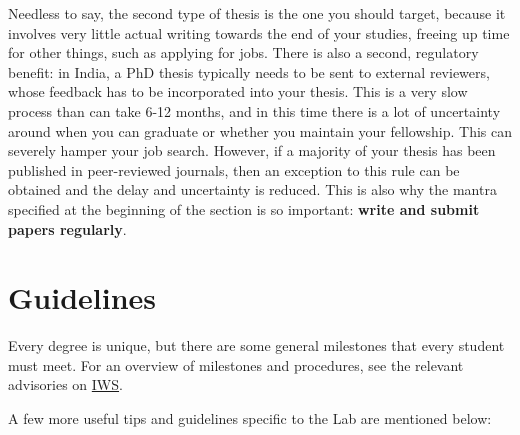 \documentclass[12pt]{article}
\begin{document}
Needless to say, the second type of thesis is the one you should target, because it involves very little actual writing towards the end of your studies, freeing up time for other things, such as applying for jobs. There is also a second, regulatory benefit: in India, a PhD thesis typically needs to be sent to external reviewers, whose feedback has to be incorporated into your thesis. This is a very slow process than can take 6-12 months, and in this time there is a lot of uncertainty around when you can graduate or whether you maintain your fellowship. This can severely hamper your job search. However, if a majority of your thesis has been published in peer-reviewed journals, then an exception to this rule can be obtained and the delay and uncertainty is reduced. This is also why the mantra specified at the beginning of the section is so important: \textbf{write and submit papers regularly}.

\newpage

\section{Guidelines}
Every degree is unique, but there are some general milestones that every student must meet. For an overview of milestones and procedures, see the relevant advisories on \href{https://sites.google.com/iitgn.ac.in/iws/}{IWS}.

A few more useful tips and guidelines specific to the Lab are mentioned below:
\end{document}
